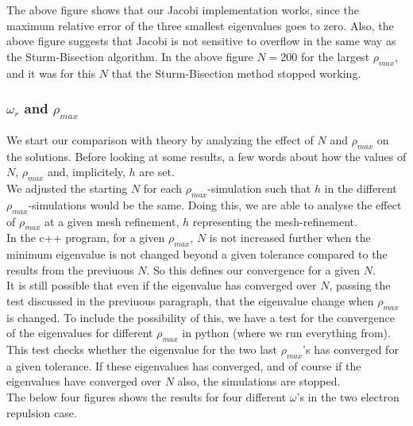 \documentclass{article}
\begin{document}
The above figure shows that our Jacobi implementation works, since the maximum relative error of the three smallest eigenvalues goes to zero. Also, the above figure suggests that Jacobi is not sensitive to overflow in the same way as the Sturm-Bisection algorithm. In the above figure $N=200$ for the largest $\rho_{max}$, and it was for this $N$ that the Sturm-Bisection method stopped working.

\subsubsection{$\omega_r$ and $\rho_{max}$}
We start our comparison with theory by analyzing the effect of $N$ and $\rho_{max}$ on the solutions. Before looking at some results, a few words about how the values of $N$, $\rho_{max}$ and, implicitely, $h$ are set.\\

We adjusted the starting $N$ for each $\rho_{max}$-simulation such that $h$ in the different $\rho_{max}$-simulations would be the same. Doing this, we are able to analyse the effect of $\rho_{max}$ at a given mesh refinement, $h$ representing the mesh-refinement.\\

In the c++ program, for a given $\rho_{max}$, $N$ is not increased further when the minimum eigenvalue is not changed beyond a given tolerance compared to the results from the previuous $N$. So this defines our convergence for a given $N$. \\

It is still possible that even if the eigenvalue has converged over $N$, passing the test discussed in the previuous paragraph, that the eigenvalue change when $\rho_{max}$ is changed. To include the possibility of this, we have a test for the convergence of the eigenvalues for different $\rho_{max}$ in python (where we run everything from). This test checks whether the eigenvalue for the two last $\rho_{max}$'s has converged for a given tolerance. If these eigenvalues has converged, and of course if the eigenvalues have converged over $N$ also, the simulations are stopped.\\

The below four figures shows the results for four different $\omega$'s in the two electron repulsion case.
\end{document}
